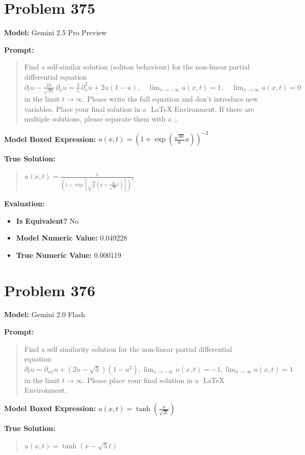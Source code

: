 \documentclass{article}
\begin{document}
{\section*{Problem 375}
\textbf{Model:} Gemini 2.5 Pro Preview

\textbf{Prompt:}
\begin{quote}
Find a self-similar solution (soliton behaviour) for the non-linear partial differential equation $\partial_t u - \frac{10}{\sqrt{30}} \, \partial_x u = \frac{2}{5} \, \partial_x^2 u + 2 u (1 - u), \quad \lim_{x \to -\infty} u(x,t) = 1, \quad \lim_{x \to \infty} u(x,t) = 0$ in the limit $t \rightarrow \infty$. Please write the full equation and don't introduce new variables. Place your final solution in a $\boxed{}$ LaTeX Environment. If there are multiple solutions, please separate them with a ;.
\end{quote}
\textbf{Model Boxed Expression:} $u(x,t) = \left(1+\exp\left(\frac{\sqrt{30}}{6}x\right)\right)^{-2}$

\textbf{True Solution:}
\begin{quote}
$u(x,t) = \frac{1}{\left(1 + \exp\left[\sqrt{\frac{5}{6}}\left(x + \frac{10}{\sqrt{30}} t \right)\right] \right)^2}$
\end{quote}

\textbf{Evaluation:}
\begin{itemize}
\item \textbf{Is Equivalent?} No
\item \textbf{Model Numeric Value:} 0.049228
\item \textbf{True Numeric Value:} 0.000119
\end{itemize}
\vspace{1cm}
\section*{Problem 376}
\textbf{Model:} Gemini 2.0 Flash

\textbf{Prompt:}
\begin{quote}
Find a self similarity solution for the non-linear partial differential equation $ \partial_t u = \partial_{xx} u + (2u-\sqrt{5})(1-u^2), \lim_{x \to -\infty} u(x,t) = -1, \lim_{x \to \infty} u(x,t) = 1 $ in the limit $t \rightarrow \infty$. Please place your final solution in a $\boxed{}$ LaTeX Environment.
\end{quote}
\textbf{Model Boxed Expression:} $u(x,t) = \tanh\left(\frac{x}{\sqrt{2t}}\right)$

\textbf{True Solution:}
\begin{quote}
$u(x,t)=\tanh(x-\sqrt{5}t)$
\end{quote}

}
\end{document}
